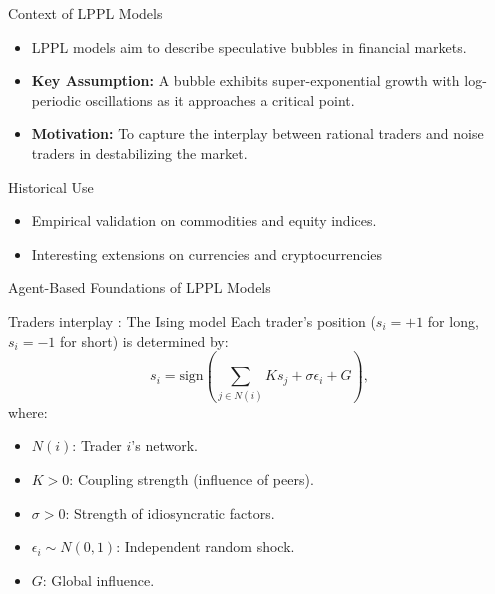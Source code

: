 \documentclass{beamer}
\begin{document}
\begin{frame}{Context of LPPL Models}
    \begin{itemize}
        \item LPPL models aim to describe speculative bubbles in financial markets.
        \item \textbf{Key Assumption:} A bubble exhibits super-exponential growth with log-periodic oscillations as it approaches a critical point.
        \item \textbf{Motivation:} To capture the interplay between rational traders and noise traders in destabilizing the market.
    \end{itemize}
    \begin{block}{Historical Use}
        \begin{itemize}
            \item Empirical validation on commodities and equity indices.
            \item Interesting extensions on currencies and cryptocurrencies
        \end{itemize}
    \end{block}
\end{frame}

\begin{frame}{Agent-Based Foundations of LPPL Models}
    \begin{block}{Traders interplay : The Ising model}
        Each trader’s position (\(s_i = +1\) for long, \(s_i = -1\) for short) is determined by:
        \[
        s_i = \text{sign}\left( \sum_{j \in N(i)} K s_j + \sigma \epsilon_i + G \right),
        \]
        where:
        \begin{itemize}
            \item \(N(i)\): Trader \(i\)’s network.
            \item \(K > 0\): Coupling strength (influence of peers).
            \item \(\sigma > 0\): Strength of idiosyncratic factors.
            \item \(\epsilon_i \sim N(0,1)\): Independent random shock.
            \item \(G\): Global influence.
        \end{itemize}
    \end{block}
\end{frame}
\end{document}

